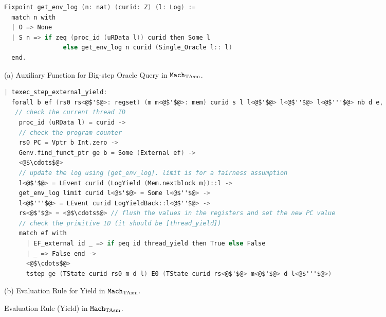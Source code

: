 \begin{figure}
\begin{lstlisting}[language=C]
Fixpoint get_env_log (n: nat) (curid: Z) (l: Log) :=
  match n with
  | O => None
  | S n => if zeq (proc_id (uRData l)) curid then Some l
                else get_env_log n curid (Single_Oracle l:: l)
  end.
\end{lstlisting}
\begin{center}
(a) Auxiliary Function for Big-step Oracle Query in ${\mathrm{\texttt{Mach}}}_{\mathrm{TAsm}}$.
\end{center}

\begin{lstlisting}[language=C]
| texec_step_external_yield:
  forall b ef (rs0 rs<@$'$@>: regset) (m m<@$'$@>: mem) curid s l l<@$'$@> l<@$''$@> l<@$'''$@> nb d e,
   // check the current thread ID
    proc_id (uRData l) = curid ->
    // check the program counter
    rs0 PC = Vptr b Int.zero ->
    Genv.find_funct_ptr ge b = Some (External ef) ->
    <@$\cdots$@>
    // update the log using [get_env_log]. limit is for a fairness assumption
    l<@$'$@> = LEvent curid (LogYield (Mem.nextblock m))::l ->
    get_env_log limit curid l<@$'$@> = Some l<@$''$@> ->
    l<@$'''$@> = LEvent curid LogYieldBack::l<@$''$@> ->
    rs<@$'$@> = <@$\cdots$@> // flush the values in the registers and set the new PC value
    // check the primitive ID (it should be [thread_yield])
    match ef with 
      | EF_external id _ => if peq id thread_yield then True else False
      | _ => False end ->
	  <@$\cdots$@>
      tstep ge (TState curid rs0 m d l) E0 (TState curid rs<@$'$@> m<@$'$@> d l<@$'''$@>)
\end{lstlisting}
\begin{center}
(b) Evaluation Rule for Yield in  ${\mathrm{\texttt{Mach}}}_{\mathrm{TAsm}}$.
\end{center}
\caption{Evaluation Rule (Yield) in ${\mathrm{\texttt{Mach}}}_{\mathrm{TAsm}}$.}
\label{fig:chapter:conlink:yield-rule-in-tasm}
\end{figure}


